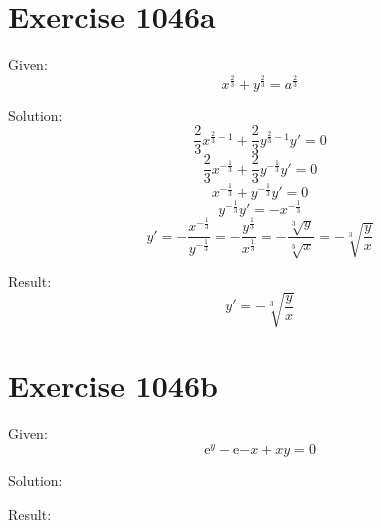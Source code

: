 \documentclass[a4paper, 10pt]{scrartcl}
\newcommand*\euler{\mathrm{e}}
\begin{document}
\section{Exercise 1046a}

Given:
\[
x^{\frac{2}{3}} + y^{\frac{2}{3}} = a^{\frac{2}{3}}
\]

Solution:
\[
\frac{2}{3}x^{\frac{2}{3} - 1} + \frac{2}{3}y^{\frac{2}{3} - 1}y' = 0
\]
\[
\frac{2}{3}x^{-\frac{1}{3}} + \frac{2}{3}y^{-\frac{1}{3}}y' = 0
\]
\[
x^{-\frac{1}{3}} + y^{-\frac{1}{3}}y' = 0
\]
\[
y^{-\frac{1}{3}}y' = -x^{-\frac{1}{3}}
\]
\[
y' = -\frac{x^{-\frac{1}{3}}}{y^{-\frac{1}{3}}} = -\frac{y^{\frac{1}{3}}}{x^{\frac{1}{3}}} = -\frac{\sqrt[3]{y}}{\sqrt[3]{x}}
= -\sqrt[3]{\frac{y}{x}}
\]

Result:
\[
y'= -\sqrt[3]{\frac{y}{x}}
\]

\section{Exercise 1046b}

Given:
\[
\euler^{y} - \euler{-x} + xy = 0
\]

Solution:

Result:
\end{document}
